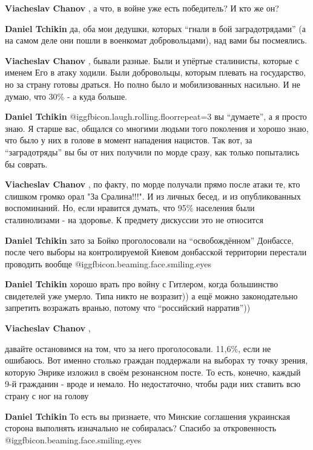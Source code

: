 \begin{itemize}
\begin{itemize}
\textbf{Viacheslav Chanov} , а что, в войне уже есть победитель? И кто же он?

\textbf{Daniel Tchikin} да, оба мои дедушки, которых \enquote{гнали в бой заградотрядами} (а на самом деле они пошли в военкомат добровольцами), над вами бы посмеялись.

\textbf{Viacheslav Chanov} , бывали разные. Были и упёртые сталинисты, которые с именем Его в атаку ходили. Были добровольцы, которым плевать на государство, но за страну готовы драться. Но полно было и мобилизованных насильно. И не думаю, что 30\% - а куда больше.

\textbf{Daniel Tchikin}  @igg{fbicon.laugh.rolling.floor}{repeat=3} вы \enquote{думаете}, а я просто знаю. Я старше вас, общался со многими людьми того поколения и хорошо знаю, что было у них в голове в момент нападения нацистов. Так вот, за \enquote{заградотряды} вы бы от них получили по морде сразу, как только попытались бы соврать.

\textbf{Viacheslav Chanov} , по факту, по морде получали прямо после атаки те, кто слишком громко орал "За Сралина!!!". И из личных бесед, и из опубликованных воспоминаний.
Но, если нравится думать, что 95\% населения были сталинолизами - на здоровье. К предмету дискуссии это не относится

\textbf{Daniel Tchikin} зато за Бойко проголосовали на \enquote{освобождённом} Донбассе, после чего выборы на контролируемой Киевом донбасской территории перестали проводить вообще  @igg{fbicon.beaming.face.smiling.eyes} 

\textbf{Daniel Tchikin} хорошо врать про войну с Гитлером, когда большинство свидетелей уже умерло. Типа никто не возразит)) а ещё можно законодательно запретить возражать вранью, потому что \enquote{российский нарратив}))

\textbf{Viacheslav Chanov} , 

давайте остановимся на том, что за него проголосовали. 11,6\%, если не ошибаюсь.
Вот именно столько граждан поддержали на выборах ту точку зрения, которую
Энрике изложил в своём резонансном посте. То есть, конечно, каждый 9-й
гражданин - вроде и немало. Но недостаточно, чтобы ради них ставить всю страну
с ног на голову


\textbf{Daniel Tchikin} То есть вы признаете, что Минские соглашения украинская сторона выполнять изначально не собиралась?
Спасибо за откровенность @igg{fbicon.beaming.face.smiling.eyes} 


\end{itemize}
\end{itemize}
